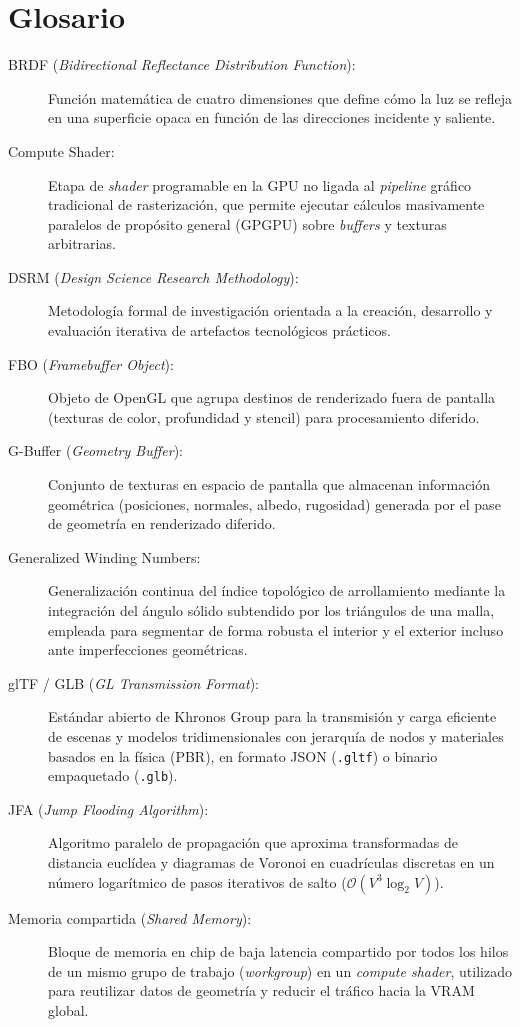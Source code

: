 \clearpage
\section{Glosario}

\begin{description}
  \item[BRDF (\textit{Bidirectional Reflectance Distribution Function}):] Función matemática de cuatro dimensiones que define cómo la luz se refleja en una superficie opaca en función de las direcciones incidente y saliente.
  \item[Compute Shader:] Etapa de \textit{shader} programable en la GPU no ligada al \textit{pipeline} gráfico tradicional de rasterización, que permite ejecutar cálculos masivamente paralelos de propósito general (GPGPU) sobre \textit{buffers} y texturas arbitrarias.
  \item[DSRM (\textit{Design Science Research Methodology}):] Metodología formal de investigación orientada a la creación, desarrollo y evaluación iterativa de artefactos tecnológicos prácticos.
  \item[FBO (\textit{Framebuffer Object}):] Objeto de OpenGL que agrupa destinos de renderizado fuera de pantalla (texturas de color, profundidad y stencil) para procesamiento diferido.
  \item[G-Buffer (\textit{Geometry Buffer}):] Conjunto de texturas en espacio de pantalla que almacenan información geométrica (posiciones, normales, albedo, rugosidad) generada por el pase de geometría en renderizado diferido.
  \item[Generalized Winding Numbers:] Generalización continua del índice topológico de arrollamiento mediante la integración del ángulo sólido subtendido por los triángulos de una malla, empleada para segmentar de forma robusta el interior y el exterior incluso ante imperfecciones geométricas.
  \item[glTF / GLB (\textit{GL Transmission Format}):] Estándar abierto de Khronos Group para la transmisión y carga eficiente de escenas y modelos tridimensionales con jerarquía de nodos y materiales basados en la física (PBR), en formato JSON (\texttt{.gltf}) o binario empaquetado (\texttt{.glb}).
  \item[JFA (\textit{Jump Flooding Algorithm}):] Algoritmo paralelo de propagación que aproxima transformadas de distancia euclídea y diagramas de Voronoi en cuadrículas discretas en un número logarítmico de pasos iterativos de salto ($\mathcal{O}(V^3 \log_2 V)$).
  \item[Memoria compartida (\textit{Shared Memory}):] Bloque de memoria en chip de baja latencia compartido por todos los hilos de un mismo grupo de trabajo (\textit{workgroup}) en un \textit{compute shader}, utilizado para reutilizar datos de geometría y reducir el tráfico hacia la VRAM global.

\end{description}
